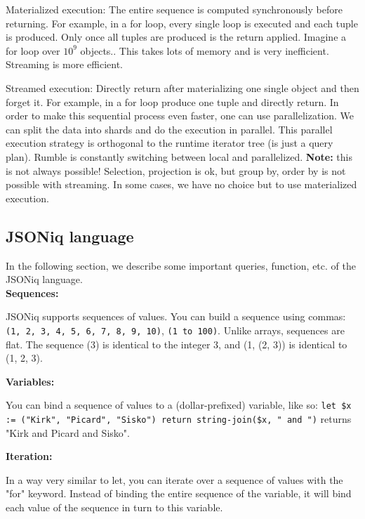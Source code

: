 \documentclass[11pt,oneside,a4paper]{article}
\begin{document}
{\begin{compactitem}
\item Materialized execution: The entire sequence is computed synchronously before returning. For example, in a for loop, every single loop is executed and each tuple is produced. Only once all tuples are produced is the return applied. Imagine a for loop over $10^9$ objects.. This takes lots of memory and is very inefficient. Streaming is more efficient.
\item Streamed execution: Directly return after materializing one single object and then forget it. For example, in a for loop produce one tuple and directly return. In order to make this sequential process even faster, one can use parallelization. We can split the data into shards and do the execution in parallel. This parallel execution strategy is orthogonal to the runtime iterator tree (is just a query plan). Rumble is constantly switching between local and parallelized. \textbf{Note:} this is not always possible! Selection, projection is ok, but group by, order by is not possible with streaming. In some cases, we have no choice but to use materialized execution.\\
\end{compactitem}

\subsection{JSONiq language}

In the following section, we describe some important queries, function, etc. of the JSONiq language.\\

\textbf{Sequences:}

JSONiq supports sequences of values. You can build a sequence using commas: \texttt{ (1, 2, 3, 4, 5, 6, 7, 8, 9, 10)}, \texttt{(1 to 100)}. Unlike arrays, sequences are flat. The sequence (3) is identical to the integer 3, and (1, (2, 3)) is identical to (1, 2, 3).

\textbf{Variables:}

You can bind a sequence of values to a (dollar-prefixed) variable, like so: \texttt{let \$x := ("Kirk", "Picard", "Sisko") return string-join(\$x, " and ")} returns "Kirk and Picard and Sisko".

\textbf{Iteration:}

In a way very similar to let, you can iterate over a sequence of values with the "for" keyword. Instead of binding the entire sequence of the variable, it will bind each value of the sequence in turn to this variable.

}
\end{document}
